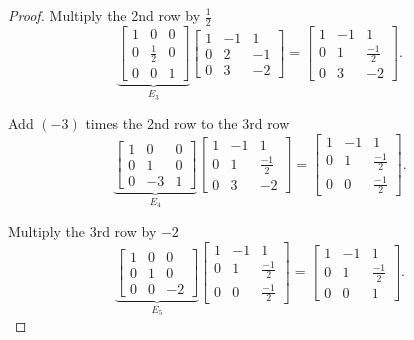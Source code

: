 \begin{proof}
    Multiply the 2nd row by $\frac{1}{2}$
    \[
        \underbrace{\begin{bmatrix}
                1 & 0           & 0 \\
                0 & \frac{1}{2} & 0 \\
                0 & 0           & 1
            \end{bmatrix}}_{E_{3}}
        \begin{bmatrix}
            1 & -1 & 1  \\
            0 & 2  & -1 \\
            0 & 3  & -2
        \end{bmatrix}
        =
        \begin{bmatrix}
            1 & -1 & 1            \\
            0 & 1  & \frac{-1}{2} \\
            0 & 3  & -2
        \end{bmatrix}.
    \]

    Add $(-3)$ times the 2nd row to the 3rd row
    \[
        \underbrace{\begin{bmatrix}
                1 & 0  & 0 \\
                0 & 1  & 0 \\
                0 & -3 & 1
            \end{bmatrix}}_{E_{4}}
        \begin{bmatrix}
            1 & -1 & 1            \\
            0 & 1  & \frac{-1}{2} \\
            0 & 3  & -2
        \end{bmatrix}
        =
        \begin{bmatrix}
            1 & -1 & 1            \\
            0 & 1  & \frac{-1}{2} \\
            0 & 0  & \frac{-1}{2}
        \end{bmatrix}.
    \]

    Multiply the 3rd row by $-2$
    \[
        \underbrace{\begin{bmatrix}
                1 & 0 & 0  \\
                0 & 1 & 0  \\
                0 & 0 & -2
            \end{bmatrix}}_{E_{5}}
        \begin{bmatrix}
            1 & -1 & 1            \\
            0 & 1  & \frac{-1}{2} \\
            0 & 0  & \frac{-1}{2}
        \end{bmatrix}
        =
        \begin{bmatrix}
            1 & -1 & 1            \\
            0 & 1  & \frac{-1}{2} \\
            0 & 0  & 1
        \end{bmatrix}.
    \]


\end{proof}
